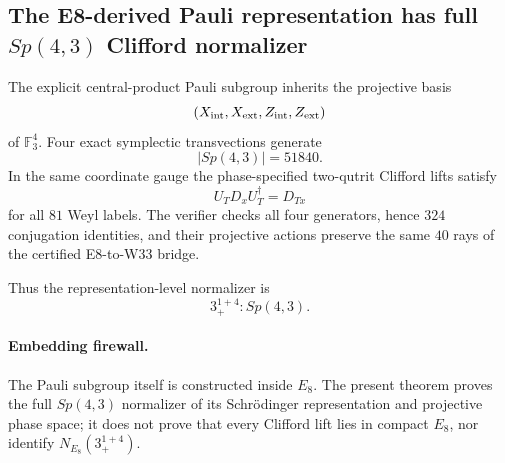 \subsection*{The E8-derived Pauli representation has full $Sp(4,3)$ Clifford normalizer}

The explicit central-product Pauli subgroup inherits the projective basis
\[
(X_{\rm int},X_{\rm ext},Z_{\rm int},Z_{\rm ext})
\]
of $\mathbb F_3^4$. Four exact symplectic transvections generate
\[
\boxed{|Sp(4,3)|=51840}.
\]
In the same coordinate gauge the phase-specified two-qutrit Clifford lifts satisfy
\[
U_TD_xU_T^\dagger=D_{Tx}
\]
for all $81$ Weyl labels. The verifier checks all four generators, hence $324$ conjugation identities, and their projective actions preserve the same $40$ rays of the certified E8-to-W33 bridge.

Thus the representation-level normalizer is
\[
\boxed{3_+^{1+4}:Sp(4,3)}.
\]

\paragraph{Embedding firewall.}
The Pauli subgroup itself is constructed inside $E_8$. The present theorem proves the full $Sp(4,3)$ normalizer of its Schrödinger representation and projective phase space; it does not prove that every Clifford lift lies in compact $E_8$, nor identify $N_{E_8}(3_+^{1+4})$.

